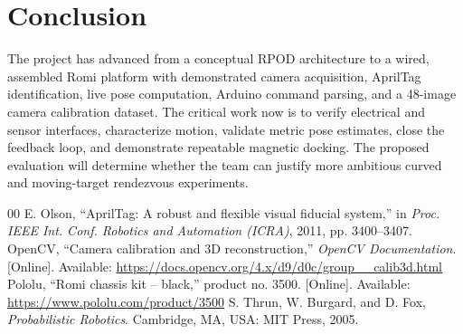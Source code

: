 \documentclass[conference,letterpaper,10pt]{IEEEtran}
\begin{document}
\section{Conclusion}
The project has advanced from a conceptual RPOD architecture to a wired, assembled Romi platform with demonstrated camera acquisition, AprilTag identification, live pose computation, Arduino command parsing, and a 48-image camera calibration dataset. The critical work now is to verify electrical and sensor interfaces, characterize motion, validate metric pose estimates, close the feedback loop, and demonstrate repeatable magnetic docking. The proposed evaluation will determine whether the team can justify more ambitious curved and moving-target rendezvous experiments.

\begin{thebibliography}{00}
 E. Olson, ``AprilTag: A robust and flexible visual fiducial system,'' in \emph{Proc. IEEE Int. Conf. Robotics and Automation (ICRA)}, 2011, pp. 3400--3407.
 OpenCV, ``Camera calibration and 3D reconstruction,'' \emph{OpenCV Documentation}. [Online]. Available: \url{https://docs.opencv.org/4.x/d9/d0c/group__calib3d.html}
 Pololu, ``Romi chassis kit -- black,'' product no. 3500. [Online]. Available: \url{https://www.pololu.com/product/3500}
 S. Thrun, W. Burgard, and D. Fox, \emph{Probabilistic Robotics}. Cambridge, MA, USA: MIT Press, 2005.
\end{thebibliography}
\end{document}
